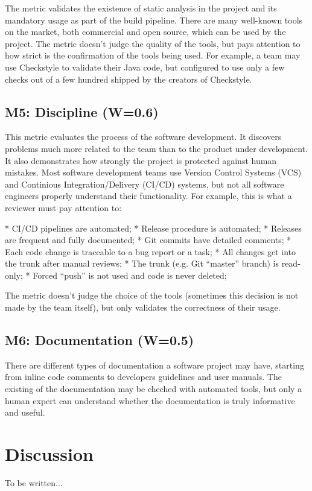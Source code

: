 \documentclass[manuscript,12pt,nonacm=true,oneside]{acmart}
\begin{document}
The metric validates the existence of static analysis in the project
and its mandatory usage as part of the build pipeline.
There are many well-known tools on the market, both commercial and
open source, which can be used by the project. The metric doesn't judge
the quality of the tools, but pays attention to how strict is the
confirmation of the tools being used. For example, a team may use Checkstyle
to validate their Java code, but configured to use only a few checks
out of a few hundred shipped by the creators of Checkstyle.

\subsection{M5: Discipline (W=0.6)}

This metric evaluates the process of the software
development. It discovers problems much more related to the team than
to the product under development. It also demonstrates how strongly the project is
protected against human mistakes. Most software development teams use
Version Control Systems (VCS) and Continious Integration/Delivery (CI/CD) systems, but not all
software engineers properly understand their functionality. For example, this is what
a reviewer must pay attention to:

  * CI/CD pipelines are automated;
  * Release procedure is automated;
  * Releases are frequent and fully documented;
  * Git commits have detailed comments;
  * Each code change is traceable to a bug report or a task;
  * All changes get into the trunk after manual reviews;
  * The trunk (e.g. Git ``master'' branch) is read-only;
  * Forced ``push'' is not used and code is never deleted;

The metric doesn't judge the choice of the tools (sometimes this decision
is not made by the team itself), but only validates the correctness
of their usage.

\subsection{M6: Documentation (W=0.5)}

There are different types of documentation a software project may have,
starting from inline code comments to developers guidelines and user manuals.
The existing of the documentation may be cheched with automated tools,
but only a human expert can understand whether the documentation is truly
informative and useful.

\section{Discussion}
\label{sec:discussion}

To be written...



\end{document}
